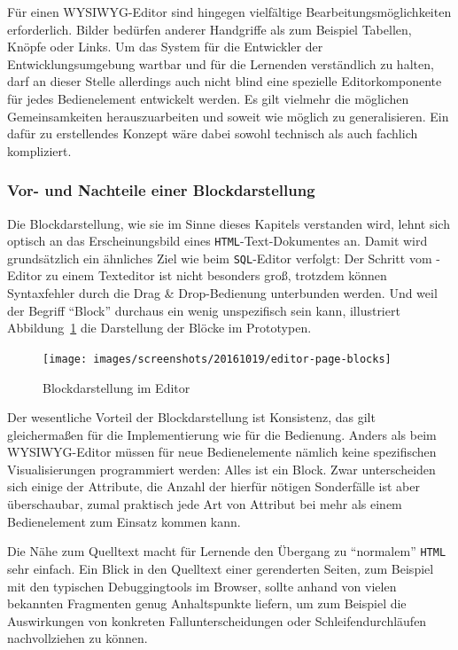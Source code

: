 Für einen WYSIWYG-Editor sind hingegen vielfältige Bearbeitungsmöglichkeiten erforderlich. Bilder bedürfen anderer Handgriffe als zum Beispiel Tabellen, Knöpfe oder Links. Um das System für die Entwickler der Entwicklungsumgebung wartbar und für die Lernenden verständlich zu halten, darf an dieser Stelle allerdings auch nicht blind eine spezielle Editorkomponente für jedes Bedienelement entwickelt werden. Es gilt vielmehr die möglichen Gemeinsamkeiten herauszuarbeiten und soweit wie möglich zu generalisieren. Ein dafür zu erstellendes Konzept wäre dabei sowohl technisch als auch fachlich kompliziert.

\subsubsection{Vor- und Nachteile einer Blockdarstellung}

Die Blockdarstellung, wie sie im Sinne dieses Kapitels verstanden wird, lehnt sich optisch an das Erscheinungsbild eines \texttt{HTML}-Text-Dokumentes an. Damit wird grundsätzlich ein ähnliches Ziel wie beim \texttt{SQL}-Editor verfolgt: Der Schritt vom \idename{}-Editor zu einem Texteditor ist nicht besonders groß, trotzdem können Syntaxfehler durch die Drag \& Drop-Bedienung unterbunden werden. Und weil der Begriff "`Block"' durchaus ein wenig unspezifisch sein kann, illustriert Abbildung~\ref{fig:screen-ui-editor-block} die Darstellung der Blöcke im Prototypen.

\begin{figure}[h]
  \texttt{[image: images/screenshots/20161019/editor-page-blocks]}
  \caption{Blockdarstellung im Editor}
  \label{fig:screen-ui-editor-block}
\end{figure}

Der wesentliche Vorteil der Blockdarstellung ist Konsistenz, das gilt gleichermaßen für die Implementierung wie für die Bedienung. Anders als beim WYSIWYG-Editor müssen für neue Bedienelemente nämlich keine spezifischen Visualisierungen programmiert werden: Alles ist ein Block. Zwar unterscheiden sich einige der Attribute, die Anzahl der hierfür nötigen Sonderfälle ist aber überschaubar, zumal praktisch jede Art von Attribut bei mehr als einem Bedienelement zum Einsatz kommen kann.

Die Nähe zum Quelltext macht für Lernende den Übergang zu "`normalem"' \texttt{HTML} sehr einfach. Ein Blick in den Quelltext einer gerenderten Seiten, zum Beispiel mit den typischen Debuggingtools im Browser, sollte anhand von vielen bekannten Fragmenten genug Anhaltspunkte liefern, um zum Beispiel die Auswirkungen von konkreten Fallunterscheidungen oder Schleifendurchläufen nachvollziehen zu können.

